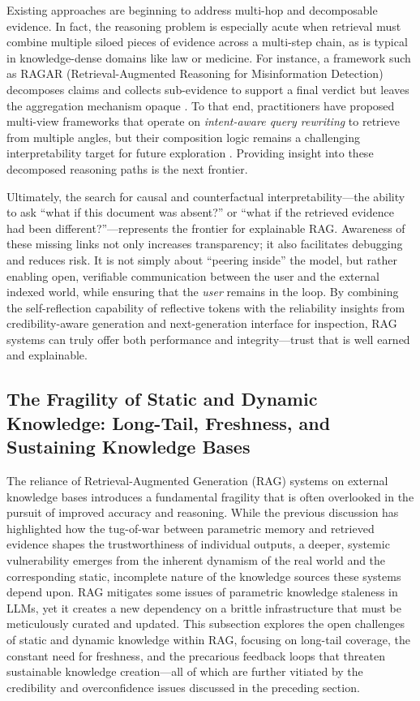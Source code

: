 \documentclass[11pt]{article}
\begin{document}
Existing approaches are beginning to address multi-hop and decomposable evidence. In fact, the reasoning problem is especially acute when retrieval must combine multiple siloed pieces of evidence across a multi-step chain, as is typical in knowledge-dense domains like law or medicine. For instance, a framework such as RAGAR (Retrieval-Augmented Reasoning for Misinformation Detection) decomposes claims and collects sub-evidence to support a final verdict but leaves the aggregation mechanism opaque \cite{ref240}. To that end, practitioners have proposed multi-view frameworks that operate on \emph{intent-aware query rewriting} to retrieve from multiple angles, but their composition logic remains a challenging interpretability target for future exploration \cite{ref182}. Providing insight into these decomposed reasoning paths is the next frontier.

Ultimately, the search for causal and counterfactual interpretability---the ability to ask ``what if this document was absent?'' or ``what if the retrieved evidence had been different?''---represents the frontier for explainable RAG. Awareness of these missing links not only increases transparency; it also facilitates debugging and reduces risk. It is not simply about ``peering inside'' the model, but rather enabling open, verifiable communication between the user and the external indexed world, while ensuring that the \emph{user} remains in the loop. By combining the self-reflection capability of reflective tokens with the reliability insights from credibility-aware generation and next-generation interface for inspection, RAG systems can truly offer both performance and integrity---trust that is well earned and explainable.

\subsection{The Fragility of Static and Dynamic Knowledge: Long-Tail, Freshness, and Sustaining Knowledge Bases}

The reliance of Retrieval-Augmented Generation (RAG) systems on external knowledge bases introduces a fundamental fragility that is often overlooked in the pursuit of improved accuracy and reasoning. While the previous discussion has highlighted how the tug-of-war between parametric memory and retrieved evidence shapes the trustworthiness of individual outputs, a deeper, systemic vulnerability emerges from the inherent dynamism of the real world and the corresponding static, incomplete nature of the knowledge sources these systems depend upon. RAG mitigates some issues of parametric knowledge staleness in LLMs, yet it creates a new dependency on a brittle infrastructure that must be meticulously curated and updated. This subsection explores the open challenges of static and dynamic knowledge within RAG, focusing on long-tail coverage, the constant need for freshness, and the precarious feedback loops that threaten sustainable knowledge creation---all of which are further vitiated by the credibility and overconfidence issues discussed in the preceding section.
\end{document}

